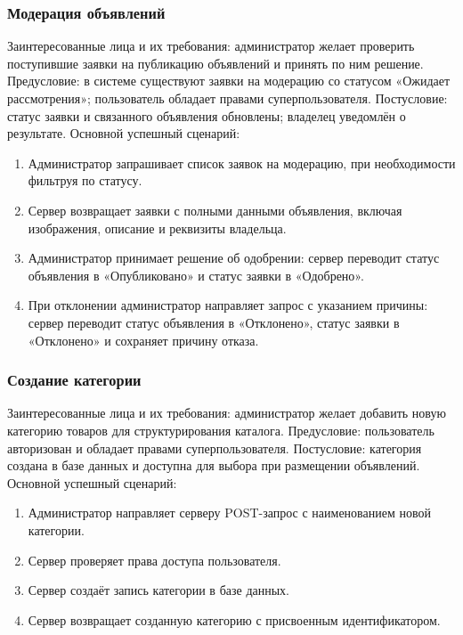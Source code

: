 \subsubsection{Модерация объявлений}
Заинтересованные лица и их требования: администратор желает проверить поступившие заявки на публикацию объявлений и принять по ним решение.
Предусловие: в системе существуют заявки на модерацию со статусом «Ожидает рассмотрения»; пользователь обладает правами суперпользователя.
Постусловие: статус заявки и связанного объявления обновлены; владелец уведомлён о результате.
Основной успешный сценарий:
\begin{enumerate}
\item Администратор запрашивает список заявок на модерацию, при необходимости фильтруя по статусу.
\item Сервер возвращает заявки с полными данными объявления, включая изображения, описание и реквизиты владельца.
\item Администратор принимает решение об одобрении: сервер переводит статус объявления в «Опубликовано» и статус заявки в «Одобрено».
\item При отклонении администратор направляет запрос с указанием причины: сервер переводит статус объявления в «Отклонено», статус заявки в «Отклонено» и сохраняет причину отказа.
\end{enumerate}

\subsubsection{Создание категории}
Заинтересованные лица и их требования: администратор желает добавить новую категорию товаров для структурирования каталога.
Предусловие: пользователь авторизован и обладает правами суперпользователя.
Постусловие: категория создана в базе данных и доступна для выбора при размещении объявлений.
Основной успешный сценарий:
\begin{enumerate}
\item Администратор направляет серверу POST-запрос с наименованием новой категории.
\item Сервер проверяет права доступа пользователя.
\item Сервер создаёт запись категории в базе данных.
\item Сервер возвращает созданную категорию с присвоенным идентификатором.
\end{enumerate}

